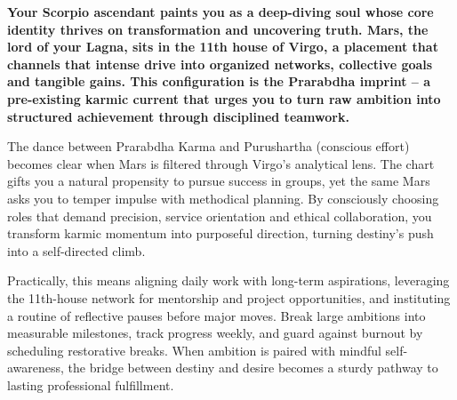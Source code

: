 
\label{topic5}

{\fontsize{9.5}{13.8}\selectfont\bfseries\color{DeepSlate} Your Scorpio ascendant paints you as a deep-diving soul whose core identity thrives on transformation and uncovering truth. Mars, the lord of your Lagna, sits in the 11th house of Virgo, a placement that channels that intense drive into organized networks, collective goals and tangible gains. This configuration is the Prarabdha imprint -- a pre-existing karmic current that urges you to turn raw ambition into structured achievement through disciplined teamwork.}\par\vspace{2mm}

{\fontsize{9}{13}\selectfont The dance between Prarabdha Karma and Purushartha (conscious effort) becomes clear when Mars is filtered through Virgo's analytical lens. The chart gifts you a natural propensity to pursue success in groups, yet the same Mars asks you to temper impulse with methodical planning. By consciously choosing roles that demand precision, service orientation and ethical collaboration, you transform karmic momentum into purposeful direction, turning destiny's push into a self-directed climb.}\par\vspace{1.8mm}

{\fontsize{9}{13}\selectfont Practically, this means aligning daily work with long-term aspirations, leveraging the 11th-house network for mentorship and project opportunities, and instituting a routine of reflective pauses before major moves. Break large ambitions into measurable milestones, track progress weekly, and guard against burnout by scheduling restorative breaks. When ambition is paired with mindful self-awareness, the bridge between destiny and desire becomes a sturdy pathway to lasting professional fulfillment.}\par\vspace{1.8mm}

